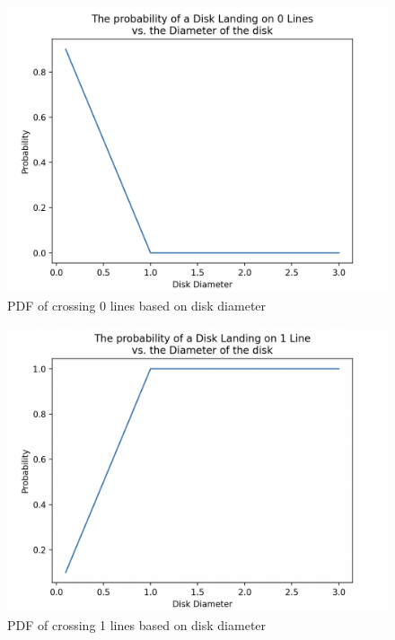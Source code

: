 \documentclass{article}
\begin{document}
\begin{figure}[hbt!]
    \centering
    \includegraphics[width=0.95\linewidth]{images/l0.png}
    \caption{PDF of crossing 0 lines based on disk diameter}
    \label{fig:l0}
\end{figure}
\begin{figure}[hbt!]
    \centering
    \includegraphics[width=0.95\linewidth]{images/l1.png}
    \caption{PDF of crossing 1 lines based on disk diameter}
    \label{fig:l1}
\end{figure}
\end{document}
